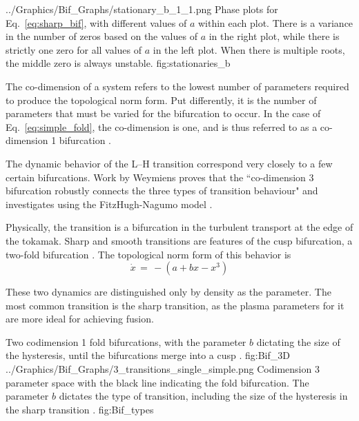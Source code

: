 	{../Graphics/Bif_Graphs/stationary_b_1_1.png}
	{Phase plots for Eq.~\ref{eq:sharp_bif}, with different values of $a$ within each plot. %
	There is a variance in the number of zeros based on the values of $a$ in the right plot, while there is strictly one zero for all values of $a$ in the left plot. %
	When there is multiple roots, the middle zero is always unstable.}
	{fig:stationaries_b}

The co-dimension of a system refers to the lowest number of parameters required to produce the topological norm form.
Put differently, it is the number of parameters that must be varied for the bifurcation to occur.
In the case of Eq.~\ref{eq:simple_fold}, the co-dimension is one, and is thus referred to as a co-dimension 1 bifurcation \cite{weymiens_bifurcation_2014}.

\todo{\color{red}{FIX HERE!}}
The dynamic behavior of the L--H transition correspond very closely to a few certain bifurcations.
Work by Weymiens proves that the ``co-dimension 3 bifurcation robustly connects the three types of transition behaviour" and investigates using the FitzHugh-Nagumo model \cite{weymiens_bifurcation_2014}.

Physically, the transition is a bifurcation in the turbulent transport at the edge of the tokamak.
Sharp and smooth transitions are features of the cusp bifurcation, a two-fold bifurcation \cite{weymiens_bifurcation_2014}. 
The topological norm form of this behavior is
\begin{equation}
	\dot{x} \,=\, -(a + bx - x^3)
	\label{eq:sharp_bif}
\end{equation}

These two dynamics are distinguished only by density as the parameter.
The most common transition is the sharp transition, as the plasma parameters for it are more ideal for achieving fusion.

	{Two codimension 1 fold bifurcations, with the parameter $b$ dictating the size of the hysteresis, until the bifurcations merge into a cusp \cite{weymiens_bifurcation_2014}.}
	{fig:Bif_3D}
	{../Graphics/Bif_Graphs/3_transitions_single_simple.png}
	{Codimension 3 parameter space with the black line indicating the fold bifurcation. The parameter $b$ dictates the type of transition, including the size of the hysteresis in the sharp transition \cite{weymiens_bifurcation_2014}.}
	{fig:Bif_types}

